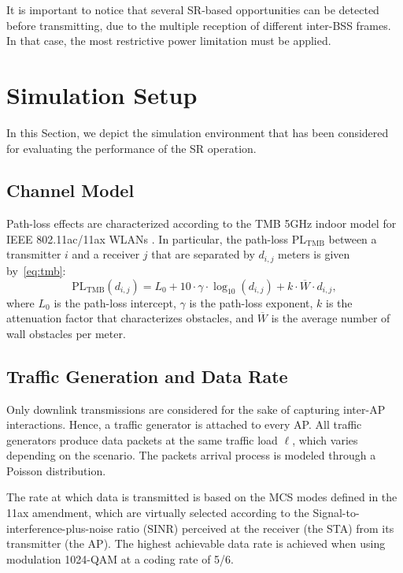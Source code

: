 \documentclass[conference]{IEEEtran}
\begin{document}
	It is important to notice that several SR-based opportunities can be detected before transmitting, due to the multiple reception of different inter-BSS frames. In that case, the most restrictive power limitation must be applied. 
	
	\section{Simulation Setup}
	\label{section:simulation_setup}
	
	In this Section, we depict the simulation environment that has been considered for evaluating the performance of the SR operation.
	
	\subsection{Channel Model}
	
	Path-loss effects are characterized according to the TMB 5GHz indoor model for IEEE 802.11ac/11ax WLANs \cite{tmb}. In particular, the path-loss $\text{PL}_\text{TMB}$ between a transmitter $i$ and a receiver $j$ that are separated by $d_{i,j}$ meters is given by~\eqref{eq:tmb}:
	\begin{equation}
	\text{PL}_\text{TMB}(d_{i,j}) = L_0 + 10 \cdot \gamma \cdot \log_{10}(d_{i,j}) + k \cdot \overline{W} \cdot d_{i,j},
	\label{eq:tmb}
	\end{equation} 
	where  $L_0$ is the path-loss
	intercept, $\gamma$ is the path-loss exponent, $k$ is the attenuation factor that characterizes obstacles, and $\overline{W}$ is the average number of wall obstacles per meter.
	
	\subsection{Traffic Generation and Data Rate}
	Only downlink transmissions are considered for the sake of capturing inter-AP interactions. Hence, a traffic generator is attached to every AP. All traffic generators produce data packets at the same traffic load $\ell$, which varies depending on the scenario. The packets arrival process is modeled through a Poisson distribution.
	
	The rate at which data is transmitted is based on the MCS modes defined in the 11ax amendment, which are virtually selected according to the Signal-to-interference-plus-noise ratio (SINR) perceived at the receiver (the STA) from its transmitter (the AP). The highest achievable data rate is achieved when using modulation 1024-QAM at a coding rate of 5/6.
	
\end{document}
